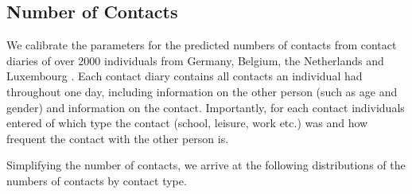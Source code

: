 \subsection{Number of Contacts}
\label{subsec:data_number_of_contacts}

We calibrate the parameters for the predicted numbers of contacts from contact diaries
of over 2000 individuals from Germany, Belgium, the Netherlands and Luxembourg
\citep{Mossong2008}. Each contact diary contains all contacts an individual had
throughout one day, including information on the other person (such as age and gender)
and information on the contact. Importantly, for each contact individuals entered of
which type the contact (school, leisure, work etc.) was and how frequent the contact
with the other person is.

Simplifying the number of contacts, we arrive at the following distributions of the
numbers of contacts by contact type.

